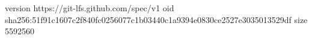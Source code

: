 version https://git-lfs.github.com/spec/v1
oid sha256:51f91c1607c2f840fc0256077c1b03440c1a9394e0830ce2527e3035013529df
size 5592560
